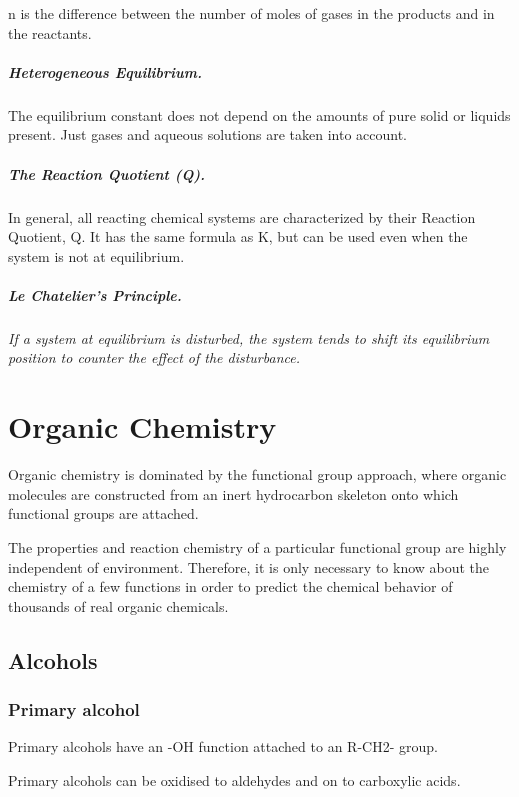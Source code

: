 \documentclass[oneside]{book} %
\theoremstyle{plain}
\begin{document}
n is the difference between the number of moles of gases in the products and in
the reactants.

\paragraph{Heterogeneous Equilibrium.} The equilibrium constant does not depend
on the amounts of pure solid
or liquids present. Just gases and aqueous solutions are taken into account.

\paragraph{The Reaction Quotient (Q).} In general, all reacting chemical
systems are characterized by their Reaction Quotient, Q. It has the same
formula as K, but can be used even when the system is not at equilibrium.

\paragraph{Le Chatelier's Principle.} \textit{If a system at equilibrium is
disturbed, the system tends to shift its equilibrium position to counter the
effect of the disturbance.}

\chapter{Organic Chemistry}
Organic chemistry is dominated by the functional group approach, where organic
molecules are constructed from an inert hydrocarbon skeleton onto which
functional groups are attached.

The properties and reaction chemistry of a particular functional group are
highly independent of environment. Therefore, it is only necessary to know about
the chemistry of a few functions in order to predict the chemical behavior of
thousands of real organic chemicals.

\section{Alcohols}
\subsection{Primary alcohol}
Primary alcohols have an -OH function attached to an R-CH2- group.

Primary alcohols can be oxidised to aldehydes and on to carboxylic acids.
\end{document}
